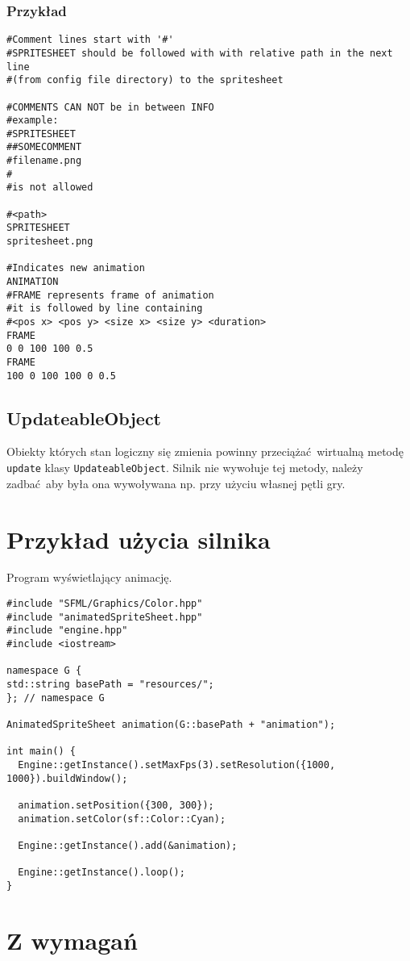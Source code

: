 \documentclass[11pt]{article}
\begin{document}
\subsubsection{Przykład}
\label{sec:orga2a986e}
\begin{verbatim}
#Comment lines start with '#'
#SPRITESHEET should be followed with with relative path in the next line
#(from config file directory) to the spritesheet

#COMMENTS CAN NOT be in between INFO
#example:
#SPRITESHEET
##SOMECOMMENT
#filename.png
#
#is not allowed

#<path>
SPRITESHEET
spritesheet.png

#Indicates new animation
ANIMATION
#FRAME represents frame of animation
#it is followed by line containing
#<pos x> <pos y> <size x> <size y> <duration>
FRAME
0 0 100 100 0.5
FRAME
100 0 100 100 0 0.5
\end{verbatim}
\subsection{UpdateableObject}
\label{sec:orgba3956d}
Obiekty których stan logiczny się zmienia powinny przeciążać wirtualną metodę \texttt{update} klasy \texttt{UpdateableObject}.
Silnik nie wywołuje tej metody, należy zadbać aby była ona wywoływana np. przy użyciu własnej pętli gry.
\section{Przykład użycia silnika}
\label{sec:org5220c91}
Program wyświetlający animację.

\begin{verbatim}
#include "SFML/Graphics/Color.hpp"
#include "animatedSpriteSheet.hpp"
#include "engine.hpp"
#include <iostream>

namespace G {
std::string basePath = "resources/";
}; // namespace G

AnimatedSpriteSheet animation(G::basePath + "animation");

int main() {
  Engine::getInstance().setMaxFps(3).setResolution({1000, 1000}).buildWindow();

  animation.setPosition({300, 300});
  animation.setColor(sf::Color::Cyan);

  Engine::getInstance().add(&animation);

  Engine::getInstance().loop();
}
\end{verbatim}
\section{Z wymagań}
\label{sec:orgb006597}
\end{document}
